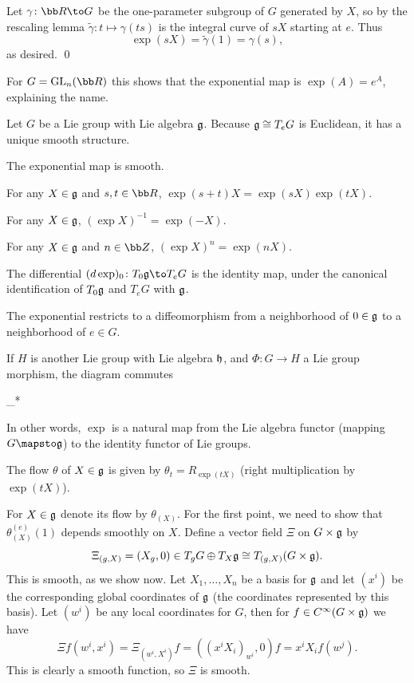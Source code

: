 \eprop

\bproof

    Let $\gamma\colon\bR\to G$ be the one-parameter subgroup of $G$ generated by $X$, so by the rescaling lemma
    $\tilde\gamma\colon t\mapsto\gamma(ts)$ is the integral curve of $sX$ starting at $e$.
    Thus
    $$ \exp(sX) = \tilde\gamma(1) = \gamma(s) , $$
    as desired.
    \qed

\eproof

\bexam

    For $G=\gl_n(\bR)$ this shows that the exponential map is $\exp(A)=e^A$, explaining the name.

\eexam

\bprop

    Let $G$ be a Lie group with Lie algebra ${{\frak g}}$.
    Because ${{\frak g}}\cong T_eG$ is Euclidean, it has a unique smooth structure.
    \benum
        \item The exponential map is smooth.
        \item For any $X\in{{\frak g}}$ and $s,t\in\bR$, $\exp(s+t)X=\exp(sX)\exp(tX)$.
        \item For any $X\in{{\frak g}}$, $(\exp X)^{-1}=\exp(-X)$.
        \item For any $X\in{{\frak g}}$ and $n\in\bZ$, $(\exp X)^n=\exp(nX)$.
        \item The differential $(d\exp)_0\colon T_0\g\to T_eG$ is the identity map, under the canonical identification of $T_0{{\frak g}}$ and $T_eG$
        with ${{\frak g}}$.
        \item The exponential restricts to a diffeomorphism from a neighborhood of $0\in{{\frak g}}$ to a neighborhood of $e\in G$.
        \item If $H$ is another Lie group with Lie algebra ${{\frak h}}$, and $\Phi\colon G\to H$ a Lie group morphism, the diagram commutes

            {\Phi_*}{\Phi}{\exp}{\exp}

        In other words, $\exp$ is a natural map from the Lie algebra functor (mapping $G\mapsto\g$) to the identity functor of Lie groups.
        \item The flow $\theta$ of $X\in{{\frak g}}$ is given by $\theta_t=R_{\exp(tX)}$ (right multiplication by $\exp(tX)$).
    \eenum

\eprop

\bproof

    For $X\in{{\frak g}}$ denote its flow by $\theta_{(X)}$.
    For the first point, we need to show that $\theta_{(X)}^{(e)}(1)$ depends smoothly on $X$.
    Define a vector field $\Xi$ on $G\times{{\frak g}}$ by
    $$ \Xi_{(g,X)} = (X_g,0) \in T_gG\oplus T_X{{\frak g}} \cong T_{(g,X)}(G\times{{\frak g}}) . $$
    This is smooth, as we show now.
    Let $X_1,\dots,X_n$ be a basis for ${{\frak g}}$ and let $(x^i)$ be the corresponding global coordinates of ${{\frak g}}$ (the coordinates represented by this
    basis).
    Let $(w^i)$ be any local coordinates for $G$, then for $f\in C^\infty(G\times{{\frak g}})$ we have
    $$ \Xi f(w^i,x^i) = \Xi_{(w^i,X^i)}f = ((x^iX_i)_{w^i},0)f = x^iX_if(w^j) . $$
    This is clearly a smooth function, so $\Xi$ is smooth.

